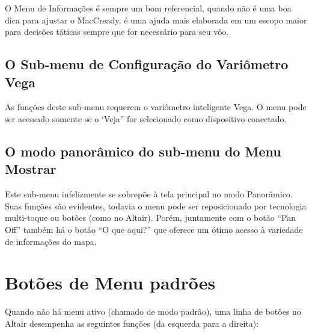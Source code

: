 O Menu de Informações é sempre um bom referencial, quando não é uma boa dica para ajustar o MacCready, é uma ajuda mais elaborada em um escopo maior para decisões táticas sempre que for necessário para seu vôo.


\subsection*{O Sub-menu de Configuração do Variômetro Vega}
\noindent{}

As funções deste sub-menu requerem o variômetro inteligente Vega.  O menu pode ser acessado somente se o ‘Veja” for selecionado como dispositivo conectado.

\subsection*{O modo panorâmico do sub-menu do Menu Mostrar}

\noindent{}

Este sub-menu infelizmente se sobrepõe à tela principal no modo Panorâmico.  Suas funções são evidentes, todavia o menu pode ser reposicionado por tecnologia multi-toque ou botões (como no Altair).  Porém, juntamente com o botão “Pan Off” também há o botão “O que aqui?” que oferece um ótimo acesso à variedade de informações do mapa.

\section{Botões de Menu padrões}

Quando não há menu ativo (chamado de modo padrão), uma linha de botões no Altair desempenha as seguintes funções (da esquerda para a direita):

